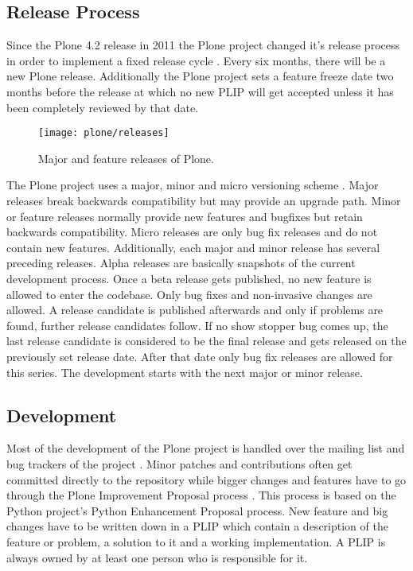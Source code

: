 
\subsection{Release Process} %

Since the Plone 4.2 release in 2011 the Plone project changed it's release
process in order to implement a fixed release cycle
\cite{PloneFixedReleaseCycle}. Every six months, there will be a new Plone
release. Additionally the Plone project sets a feature freeze date two months
before the release at which no new \ac{PLIP} will get accepted unless it has
been completely reviewed by that date.

\begin{figure}[htbp]
  \centering
  \texttt{[image: plone/releases]}
  \caption{Major and feature releases of Plone.}
\end{figure}

The Plone project uses a major, minor and micro versioning scheme
\cite{PloneReleaseProcess,PloneCommunityProcesses}. Major releases break
backwards compatibility but may provide an upgrade path. Minor or feature
releases normally provide new features and bugfixes but retain backwards
compatibility. Micro releases are only bug fix releases and do not contain new
features. Additionally, each major and minor release has several preceding
releases. Alpha releases are basically snapshots of the current development
process. Once a beta release gets published, no new feature is allowed to enter
the codebase. Only bug fixes and non-invasive changes are allowed. A release
candidate is published afterwards and only if problems are found, further
release candidates follow. If no show stopper bug comes up, the last release
candidate is considered to be the final release and gets released on the
previously set release date. After that date only bug fix releases are allowed
for this series. The development starts with the next major or minor release.


\subsection{Development} %

Most of the development of the Plone project is handled over the mailing list
and bug trackers of the project \cite{PloneContribute,PloneCommunityProcesses}.
Minor patches and contributions often get committed directly to the repository
while bigger changes and features have to go through the Plone Improvement
Proposal process
\cite{PlonePLIPProcess,PloneCommunityProcesses,PlonePLIPLifecycle}. This
process is based on the Python project's Python Enhancement Proposal process.
New feature and big changes have to be written down in a \ac{PLIP} which
contain a description of the feature or problem, a solution to it and a working
implementation. A \ac{PLIP} is always owned by at least one person who is
responsible for it.

